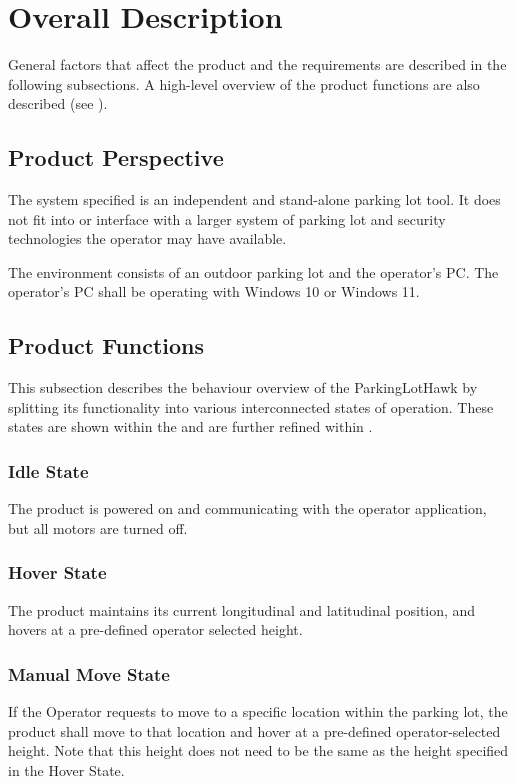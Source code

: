 \documentclass{article}
\begin{document}
\section{Overall Description}
\label{sec:Desc}
General factors that affect the product and the requirements are described in the following subsections. A high-level overview of the product functions are also described (see ). 
\subsection{Product Perspective}
The system specified is an independent and stand-alone parking lot tool. It does not fit into or interface with a larger system of parking lot and security technologies the operator may have available. 

The environment consists of an outdoor parking lot and the operator's PC. The operator's PC shall be operating with Windows 10 or Windows 11.

\subsection{Product Functions}
\label{subsec:ProdFunc}
This subsection describes the behaviour overview of the ParkingLotHawk by splitting its functionality into various interconnected states of operation. These states are shown within the  and are further refined within . 
\subsubsection{Idle State}
\label{Idle State}
The product is powered on and communicating with the operator application, but all motors are turned off. 
\subsubsection{Hover State}
\label{Hover State}
The product maintains its current longitudinal and latitudinal position, and hovers at a pre-defined operator selected height. 
\subsubsection{Manual Move State}
\label{Manual Move State}
If the Operator requests to move to a specific location within the parking lot, the product shall move to that location and hover at a pre-defined operator-selected height. Note that this height does not need to be the same as the height specified in the Hover State. 
\end{document}
